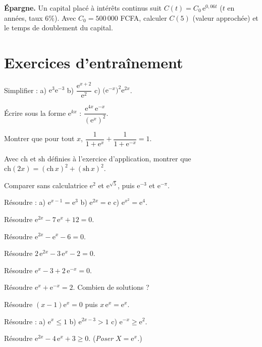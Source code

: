 \exo{} \textbf{Épargne.} Un capital placé à intérêts continus suit
$C(t)=C_0\,\mathrm{e}^{0{,}06t}$ ($t$ en années, taux $6\%$). Avec $C_0=500\,000$ FCFA,
calculer $C(5)$ (valeur approchée) et le temps de doublement du capital.

\section{Exercices d'entraînement}

\exo{} Simplifier : a) $\mathrm{e}^{3}\mathrm{e}^{-3}$ \quad
b) $\dfrac{\mathrm{e}^{x+2}}{\mathrm{e}^{2}}$ \quad c) $\big(\mathrm{e}^{-x}\big)^{2}\mathrm{e}^{2x}$.

\exo{} Écrire sous la forme $\mathrm{e}^{kx}$ :
$\dfrac{\mathrm{e}^{4x}\,\mathrm{e}^{-x}}{(\mathrm{e}^{x})^{2}}$.

\exo{} Montrer que pour tout $x$,
$\dfrac{1}{1+\mathrm{e}^{x}}+\dfrac{1}{1+\mathrm{e}^{-x}}=1$.

\exo{} Avec $\mathrm{ch}$ et $\mathrm{sh}$ définies à l'exercice d'application,
montrer que $\mathrm{ch}(2x)=(\mathrm{ch}\,x)^{2}+(\mathrm{sh}\,x)^{2}$.

\exo{} Comparer sans calculatrice $\mathrm{e}^{2}$ et $\mathrm{e}^{\sqrt5}$, puis
$\mathrm{e}^{-3}$ et $\mathrm{e}^{-\pi}$.

\exo{} Résoudre : a) $\mathrm{e}^{x-1}=\mathrm{e}^{3}$ \quad b) $\mathrm{e}^{2x}=\mathrm{e}$ \quad
c) $\mathrm{e}^{x^{2}}=\mathrm{e}^{4}$.

\exo{} Résoudre $\mathrm{e}^{2x}-7\,\mathrm{e}^{x}+12=0$.

\exo{} Résoudre $\mathrm{e}^{2x}-\mathrm{e}^{x}-6=0$.

\exo{} Résoudre $2\,\mathrm{e}^{2x}-3\,\mathrm{e}^{x}-2=0$.

\exo{} Résoudre $\mathrm{e}^{x}-3+2\,\mathrm{e}^{-x}=0$.

\exo{} Résoudre $\mathrm{e}^{x}+\mathrm{e}^{-x}=2$. Combien de solutions ?

\exo{} Résoudre $(x-1)\mathrm{e}^{x}=0$ puis $x\,\mathrm{e}^{x}=\mathrm{e}^{x}$.

\exo{} Résoudre : a) $\mathrm{e}^{x}\le 1$ \quad b) $\mathrm{e}^{2x-3}>1$ \quad
c) $\mathrm{e}^{-x}\ge \mathrm{e}^{2}$.

\exo{} Résoudre $\mathrm{e}^{2x}-4\,\mathrm{e}^{x}+3\ge 0$.
(\textit{Poser $X=\mathrm{e}^{x}$.})

